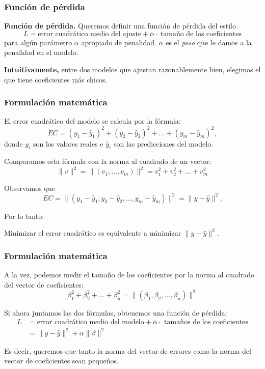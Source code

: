 \documentclass[aspectratio=169,12pt]{beamer}
\begin{document}
\begin{frame}
\frametitle{Función de pérdida}

\textbf{Función de pérdida.} Queremos definir una función de pérdida del estilo
$$L = \text{error cuadrático medio del ajuste} + \alpha \cdot \ \text{tamaño de los coeficientes}$$
para algún parámetro $\alpha$ apropiado de penalidad. $\alpha$ es el \emph{peso} que le damos a la penalidad en el modelo.

\textbf{Intuitivamente,} entre dos modelos que ajustan razonablemente bien, elegimos el que tiene coeficientes más chicos.
\end{frame}

\begin{frame}
\frametitle{Formulación matemática}

El error cuadrático del modelo se calcula por la fórmula:
$$
EC = (y_1 - \hat y_1)^2 + (y_2 - \hat y_2)^2 + \dots + (y_m - \hat y_m)^2,
$$
donde $y_i$ son los valores reales e $\hat y_i$ son las predicciones del modelo.

Comparamos esta fórmula con la norma al cuadrado  de un vector:
$$
\|v\|^2 = \|(v_1, \dots, v_m)\|^2 = v_1^2 + v_2^2 + \dots + v_m^2
$$

Observamos que
$$EC = \|(y_1 - \hat y_1, y_2 - \hat y_2, \dots, y_m - \hat y_m)\|^2 = \|y - \hat y\|^2.$$

Por lo tanto:
\begin{block}{}
\centering
Minimizar el error cuadrático es equivalente a minimizar $\|y - \hat y\|^2$.
\end{block}

\end{frame}

\begin{frame}
\frametitle{Formulación matemática}

A la vez, podemos medir el tamaño de los coeficientes por la norma al cuadrado del vector de coeficientes:
$$
\beta_1^2 + \beta_2^2 + \dots + \beta_n^2 = \|(\beta_1, \beta_2, \dots, \beta_n)\|^2
$$

Si ahora juntamos las dos fórmulas, obtenemos una función de pérdida:
\begin{align*}
L &= \text{error cuadrático medio del modelo} + \alpha \cdot \text{ tamaños de los coeficientes} \\
&= \|y - \hat y\|^2 + \alpha \|\beta\|^2
\end{align*}

Es decir, queremos que tanto la norma del vector de errores como la norma del vector de coeficientes sean pequeños.
\end{frame}
\end{document}
